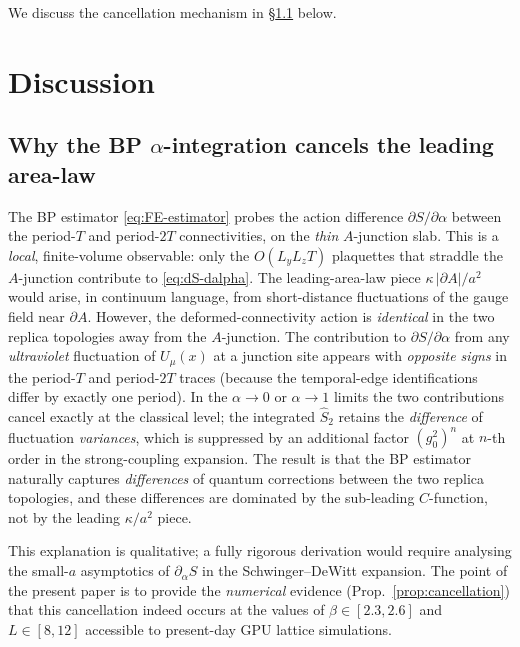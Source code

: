 \documentclass[11pt,a4paper]{article}
\theoremstyle{definition}
\begin{document}
\noindent
We discuss the cancellation mechanism in
\S\ref{sec:why-cancel} below.


\section{Discussion}
\label{sec:discussion}

\subsection{Why the BP $\alpha$-integration cancels the leading area-law}
\label{sec:why-cancel}

The BP estimator \eqref{eq:FE-estimator} probes the action
difference $\partial S/\partial\alpha$ between the period-$T$ and
period-$2T$ connectivities, on the \emph{thin} $A$-junction slab.
This is a \emph{local}, finite-volume observable: only the
$O(L_{y}L_{z}T)$ plaquettes that straddle the $A$-junction
contribute to \eqref{eq:dS-dalpha}. The leading-area-law piece
$\kappa\,|\partial A|/a^{2}$ would arise, in continuum language,
from short-distance fluctuations of the gauge field near $\partial A$.
However, the deformed-connectivity action is \emph{identical} in the
two replica topologies away from the $A$-junction. The contribution
to $\partial S/\partial\alpha$ from any \emph{ultraviolet} fluctuation
of $U_{\mu}(x)$ at a junction site appears with \emph{opposite signs}
in the period-$T$ and period-$2T$ traces (because the temporal-edge
identifications differ by exactly one period). In the $\alpha\to 0$
or $\alpha\to 1$ limits the two contributions cancel exactly at the
classical level; the integrated $\widehat S_{2}$ retains the
\emph{difference} of fluctuation \emph{variances}, which is
suppressed by an additional factor $(g_{0}^{2})^{n}$ at $n$-th order
in the strong-coupling expansion. The result is that the BP
estimator naturally captures \emph{differences} of quantum
corrections between the two replica topologies, and these differences
are dominated by the sub-leading $C$-function, not by the leading
$\kappa/a^{2}$ piece.

This explanation is qualitative; a fully rigorous derivation would
require analysing the small-$a$ asymptotics of
$\partial_{\alpha}S$ in the Schwinger--DeWitt expansion. The point of
the present paper is to provide the \emph{numerical} evidence
(Prop.~\ref{prop:cancellation}) that this cancellation indeed occurs
at the values of $\beta\in[2.3,2.6]$ and $L\in[8,12]$ accessible to
present-day GPU lattice simulations.
\end{document}
